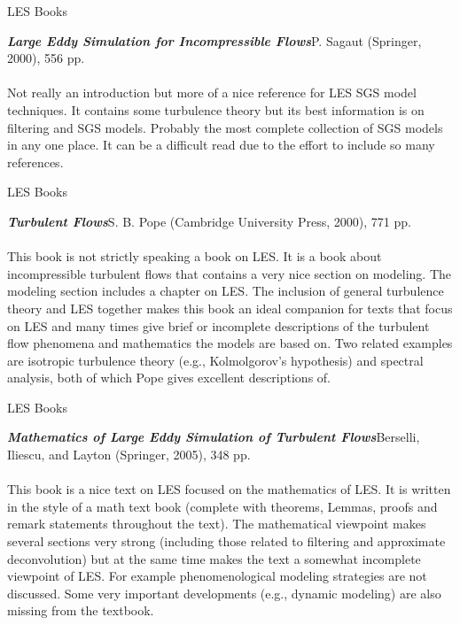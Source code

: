 \begin{frame}{LES Books}

\emph{\textbf{Large Eddy Simulation for Incompressible Flows}}\newline P. Sagaut (Springer, 2000), 556 pp.
~\\~\\
Not really an introduction but more of a nice reference for LES SGS model techniques. It contains some turbulence theory but its best information is on filtering and SGS models. Probably the most complete collection of SGS models in any one place. It can be a difficult read due to the effort to include so many references.	
\end{frame}

\begin{frame}{LES Books}

\emph{\textbf{Turbulent Flows}}\newline S. B. Pope (Cambridge University Press, 2000), 771 pp.
~\\~\\
This book is not strictly speaking a book on LES. It is a book about incompressible turbulent flows that contains a very nice section on modeling. The modeling section includes a chapter on LES. The inclusion of general turbulence theory and LES together makes this book an ideal companion for texts that focus on LES and many times give brief or incomplete descriptions of the turbulent flow phenomena and mathematics the models are based on. Two related examples are isotropic turbulence theory (e.g., Kolmolgorov's hypothesis) and spectral analysis, both of which Pope gives excellent descriptions of.
\end{frame}

\begin{frame}{LES Books}

\emph{\textbf{Mathematics of Large Eddy Simulation of Turbulent Flows}}\newline Berselli, Iliescu, and Layton (Springer, 2005), 348 pp.
~\\~\\
This book is a nice text on LES focused on the mathematics of LES. It is written in the style of a math text book (complete with theorems, Lemmas, proofs and remark statements throughout the text). The mathematical viewpoint makes several sections very strong (including those related to filtering and approximate deconvolution) but at the same time makes the text a somewhat incomplete viewpoint of LES. For example phenomenological modeling strategies are not discussed. Some very important developments (e.g., dynamic modeling) are also missing from the textbook.
\end{frame}

